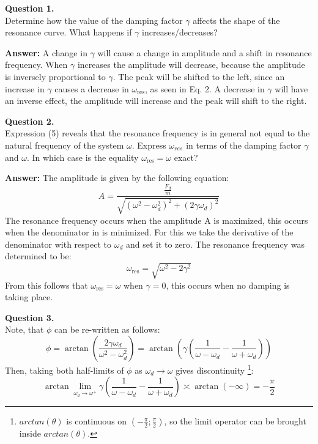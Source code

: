 \textbf{Question 1.} \\
Determine how the value of the damping factor $\gamma$ affects the shape of the resonance curve. What happens if $\gamma$ increases/decreases?

\textbf{Answer:} A change in $\gamma$ will cause a change in amplitude and a shift in resonance frequency. When $\gamma$ increases the amplitude will decrease, because the amplitude is inversely proportional to $\gamma$. The peak will be shifted to the left, since an increase in $\gamma$ causes a decrease in $\omega_{\text{res}}$, as seen in Eq. 2. A decrease in $\gamma$ will have an inverse effect, the amplitude will increase and the peak will shift to the right.

\vspace{1em}

\textbf{Question 2.} \\
Expression (5) reveals that the resonance frequency is in general not equal to the natural frequency of the system $\omega$. Express $\omega_{res}$ in terms of the damping factor $\gamma$ and $\omega$. In which case is the equality $\omega_{\text{res}} = \omega$ exact?

\textbf{Answer:} The amplitude is given by the following equation:
\begin{equation}
        A = \frac{\frac{F_d}{m}}{\sqrt{(\omega^2 - \omega_d^2)^2 + (2\gamma\omega_d)^2}}
\end{equation}
The resonance frequency occurs when the amplitude A is maximized, this occurs when the denominator in is minimized. For this we take the derivative of the denominator with respect to $\omega_d$ and set it to zero. The resonance frequency was determined to be: 
\begin{equation}
        \omega_{\text{res}} = \sqrt{\omega^2 - 2\gamma^2}
\end{equation}
From this follows that $\omega_{\text{res}} = \omega$ when $\gamma = 0$, this occurs when no damping is taking place.

\vspace{1em}

\textbf{Question 3.} \\

Note, that $\phi$ can be re-written as follows:
\begin{equation*}
        \phi = \arctan(\frac{2\gamma\omega_d}{\omega^2 - \omega_d^2}) = \arctan(\gamma ( \frac{1}{\omega-\omega_d} - \frac{1}{\omega+\omega_d} ))
\end{equation*}
Then, taking both half-limits of $\phi$ as $\omega_d \rightarrow \omega$ gives discontinuity \footnote{$arctan(\theta)$ is continuous on $(-\frac{\pi}{2};\frac{\pi}{2})$, so the limit operator can be brought inside $arctan(\theta)$.}:
\begin{equation*}
        \arctan \lim_{\omega_d \rightarrow \omega^+} {\gamma ( \frac{1}{\omega-\omega_d} - \frac{1}{\omega+\omega_d} )} \asymp \arctan( -\infty) = -\frac{\pi}{2}
\end{equation*}

